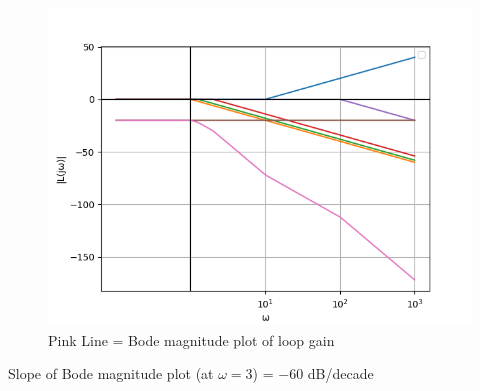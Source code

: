 \documentclass[journal,12pt,twocolumn]{IEEEtran}
\theoremstyle{remark}
\begin{document}
\begin{figure}[!h]
    \centering
    \includegraphics[width=\columnwidth]{figs/bode_mag_plot.png}
    \caption{Pink Line = Bode magnitude plot of loop gain}
\end{figure}

Slope of Bode magnitude plot (at $\omega=3$) = $-60$ dB/decade
\end{document}
